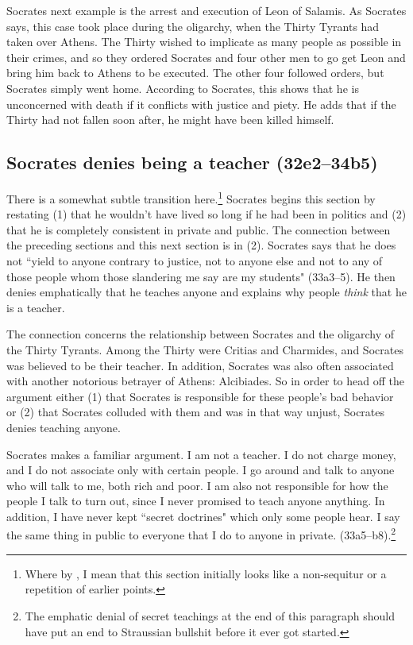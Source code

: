 \documentclass[11pt]{article}
\begin{document}
Socrates next example is the arrest and execution of Leon of Salamis.  As
Socrates says, this case took place during the oligarchy, when the Thirty
Tyrants had taken over Athens.  The Thirty wished to implicate as many people
as possible in their crimes, and so they ordered Socrates and four other men to
go get Leon and bring him back to Athens to be executed.  The other four
followed orders, but Socrates simply went home.  According to Socrates, this
shows that he is unconcerned with death if it conflicts with justice and piety.
He adds that if the Thirty had not fallen soon after, he might have been killed
himself.


\subsection{Socrates denies being a teacher (32e2--34b5)}

There is a somewhat subtle transition here.\footnote{Where by ,
I mean that this section initially looks like a non-sequitur or a repetition of
earlier points.}  Socrates begins this section by restating (1) that he
wouldn't have lived so long if he had been in politics and (2) that he is
completely consistent in private and public.  The connection between the
preceding sections and this next section is in (2).  Socrates says that he does
not ``yield to anyone contrary to justice, not to anyone else and not to any of
those people whom those slandering me say are my students" (33a3--5).  He then
denies emphatically that he teaches anyone and explains why people \emph{think}
that he is a teacher.

The connection concerns the relationship between Socrates and the oligarchy of
the Thirty Tyrants.  Among the Thirty were Critias and Charmides, and Socrates
was believed to be their teacher.  In addition, Socrates was also often
associated with another notorious betrayer of Athens: Alcibiades.  So in order
to head off the argument either (1) that Socrates is responsible for these
people's bad behavior or (2) that Socrates colluded with them and was in that
way unjust, Socrates denies teaching anyone.

Socrates makes a familiar argument.  I am not a teacher.  I do not charge
money, and I do not associate only with certain people.  I go around and talk
to anyone who will talk to me, both rich and poor.  I am also not responsible
for how the people I talk to turn out, since I never promised to teach anyone
anything.  In addition, I have never kept ``secret doctrines" which only some
people hear.  I say the same thing in public to everyone that I do to anyone in
private. (33a5--b8).\footnote{The emphatic denial of secret teachings at the
end of this paragraph should have put an end to Straussian bullshit before it
ever got started.}
\end{document}
